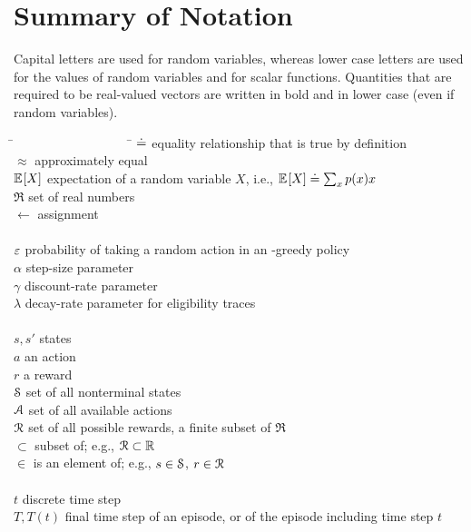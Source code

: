 \documentclass[a4paper, 12pt]{article}
\begin{document}
\section*{Summary of Notation} 
Capital letters are used for random variables, whereas lower case letters are used for
the values of random variables and for scalar functions. Quantities that are required to
be real-valued vectors are written in bold and in lower case (even if random variables).
\begin{tabbing}
    \=~~~~~~~~~~~~~~~~~~  \= \kill
    \>$\defeq$            \> equality relationship that is true by definition\\
    \>$\approx$           \> approximately equal\\
    \>$\E{X}$             \> expectation of a random variable $X$, i.e., $\E{X}\defeq\sum_x p(x)x$\\
    \>$\Re$               \> set of real numbers\\
    \>$\leftarrow$        \> assignment\\
    \\
    \>$\e$                \> probability of taking a random action in an \e-greedy policy\\
    \>$\alpha$            \> step-size parameter\\
    \>$\gamma$            \> discount-rate parameter\\
    \>$\lambda$           \> decay-rate parameter for eligibility traces\\
    \\
    \>$s, s'$             \> states\\
    \>$a$                 \> an action\\
    \>$r$                 \> a reward\\
    \>$\S$                \> set of all nonterminal states\\
    \>$\A$                \> set of all available actions\\
    \>$\R$                \> set of all possible rewards, a finite subset of $\Re$\\
    \>$\subset$           \> subset of; e.g., $\R\subset\Re$\\
    \>$\in$               \> is an element of; e.g., $s\in\S$, $r\in\R$\\
    \\
    \>$t$                 \> discrete time step\\
    \>$T, T(t)$           \> final time step of an episode, or of the episode including time step $t$\\

\end{tabbing}
\end{document}

